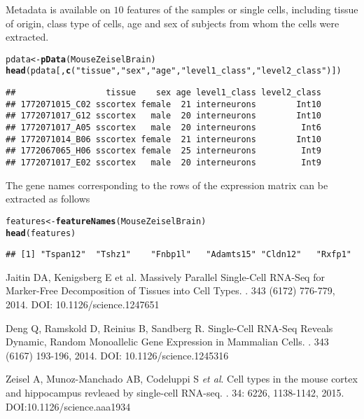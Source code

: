 \documentclass[12pt]{article}\usepackage[]{graphicx}\usepackage[usenames,dvipsnames]{color}
\makeatletter
\newcommand{\hlstr}[1]{\textcolor[rgb]{0.192,0.494,0.8}{#1}}%
\newcommand{\hlstd}[1]{\textcolor[rgb]{0.345,0.345,0.345}{#1}}%
\newcommand{\hlkwb}[1]{\textcolor[rgb]{0.69,0.353,0.396}{#1}}%
\newcommand{\hlkwd}[1]{\textcolor[rgb]{0.737,0.353,0.396}{\textbf{#1}}}%
\newenvironment{kframe}{%
 \def\at@end@of@kframe{}%
 \ifinner\ifhmode%
  \def\at@end@of@kframe{\end{minipage}}%
  \begin{minipage}{\columnwidth}%
 \fi\fi%
 \def\FrameCommand##1{\hskip\@totalleftmargin \hskip-\fboxsep
 \colorbox{shadecolor}{##1}\hskip-\fboxsep
     \hskip-\linewidth \hskip-\@totalleftmargin \hskip\columnwidth}%
 \MakeFramed {\advance\hsize-\width
   \@totalleftmargin\z@ \linewidth\hsize
   \@setminipage}}%
 {\par\unskip\endMakeFramed%
 \at@end@of@kframe}
\newenvironment{knitrout}{}{} %
\makeatother
\begin{document}
Metadata is available on $10$ features of the samples or single cells,
including tissue of origin, class type of cells, age and sex of subjects from
whom the cells were extracted.

\begin{knitrout}
\color{fgcolor}\begin{kframe}
\begin{alltt}
\hlstd{pdata} \hlkwb{<-} \hlkwd{pData}\hlstd{(MouseZeiselBrain)}
\hlkwd{head}\hlstd{(pdata[,}\hlkwd{c}\hlstd{(}\hlstr{"tissue"}\hlstd{,}\hlstr{"sex"}\hlstd{,}\hlstr{"age"}\hlstd{,}\hlstr{"level1_class"}\hlstd{,}\hlstr{"level2_class"}\hlstd{)])}
\end{alltt}
\begin{verbatim}
##                  tissue    sex age level1_class level2_class
## 1772071015_C02 sscortex female  21 interneurons        Int10
## 1772071017_G12 sscortex   male  20 interneurons        Int10
## 1772071017_A05 sscortex   male  20 interneurons         Int6
## 1772071014_B06 sscortex female  21 interneurons        Int10
## 1772067065_H06 sscortex female  25 interneurons         Int9
## 1772071017_E02 sscortex   male  20 interneurons         Int9
\end{verbatim}
\end{kframe}
\end{knitrout}

The gene names corresponding to the rows of the expression matrix can be extracted
as follows

\begin{knitrout}
\color{fgcolor}\begin{kframe}
\begin{alltt}
\hlstd{features} \hlkwb{<-} \hlkwd{featureNames}\hlstd{(MouseZeiselBrain)}
\hlkwd{head}\hlstd{(features)}
\end{alltt}
\begin{verbatim}
## [1] "Tspan12"  "Tshz1"    "Fnbp1l"   "Adamts15" "Cldn12"   "Rxfp1"
\end{verbatim}
\end{kframe}
\end{knitrout}

\begin{thebibliography}{1}

Jaitin DA,  Kenigsberg E et al.
\newblock Massively Parallel Single-Cell RNA-Seq for Marker-Free Decomposition of Tissues into Cell Types.
. 343 (6172) 776-779, 2014. DOI: 10.1126/science.1247651

Deng Q,  Ramskold D,  Reinius B,  Sandberg R.
\newblock Single-Cell RNA-Seq Reveals Dynamic, Random Monoallelic Gene Expression in Mammalian Cells.
.  343 (6167) 193-196, 2014. DOI: 10.1126/science.1245316

Zeisel A, Munoz-Manchado AB, Codeluppi S \textit{et al}.
\newblock Cell types in the mouse cortex and hippocampus revleaed by single-cell RNA-seq.
.  34: 6226, 1138-1142, 2015. DOI:10.1126/science.aaa1934

\end{thebibliography}
\end{document}
